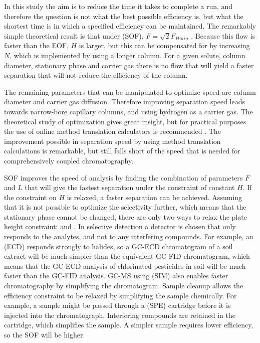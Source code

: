In this study the aim is to reduce the time it takes to complete a run, and
therefore the question is not what the best possible efficiency is, but what the
shortest time is in which a specified efficiency can be maintained. The
remarkably simple theoretical result is that under  (SOF), \(F = \sqrt{2}F_{Hmin}\) \autocite{Blumberg1997}. Because this flow
is faster than the EOF, \(H\) is larger, but this can be compensated for by
increasing \(N\), which is implemented by using a longer column. For a given
solute, column diameter, stationary phase and carrier gas there is no flow that
will yield a faster separation that will not reduce the efficiency of the
column. 

The remaining parameters that can be manipulated to optimize speed are
column diameter and carrier gas diffusion. Therefore improving separation speed
leads towards narrow-bore capillary columns, and using hydrogen as a carrier
gas. The theoretical study of optimization gives great insight, but for practical
purposes the use of online method translation calculators is recommended
\autocite{Restek2014}. The improvement possible in separation speed by using
method translation calculations is remarkable, but still falls short of the
speed that is needed for comprehensively coupled chromatography.

SOF improves the speed of analysis by finding the combination of parameters
\(F\) and \(L\) that will give the fastest separation under the constraint of
constant \(H\). If the constraint on \(H\) is relaxed, a faster separation can
be achieved. Assuming that it is not possible to optimize the selectivity
further, which means that the stationary phase cannot be changed, there are only
two ways to relax the plate height constraint:  and
. In selective detection a detector is chosen that only
responds to the analytes, and not to any interfering compounds. For example, an
 (ECD) responds strongly to halides, so a
GC-ECD chromatogram of a soil extract will be much simpler than the equivalent
GC-FID chromatogram, which means that the GC-ECD analysis of chlorinated
pesticides in soil will be much faster than the GC-FID analysis.
GC-MS using  (SIM) also enables faster
chromatography by simplifying the chromatogram. Sample cleanup allows the
efficiency constraint to be relaxed by simplifying the sample chemically. For
example, a sample might be passed through a 
(SPE) cartridge before it is injected into the chromatograph. Interfering
compounds are retained in the cartridge, which simplifies the sample. A simpler
sample requires lower efficiency, so the SOF will be higher.

